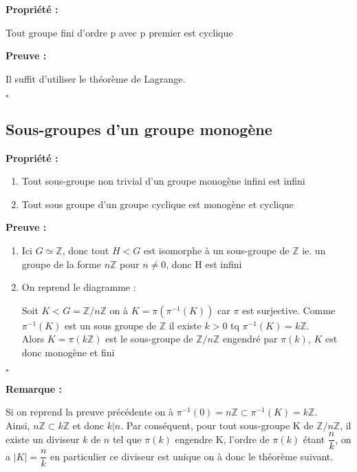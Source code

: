 \documentclass{report}
\renewenvironment{leftbar}{%
  \def\FrameCommand{\vrule width 0.4pt \hspace{10pt}}%
  \MakeFramed {\advance\hsize-\width \FrameRestore}}%
 {\endMakeFramed}%
\newenvironment{preuve}{\vspace*{0.5cm}
    \begin{leftbar}
    \noindent\textbf{Preuve :}\par}{
    \begin{flushright}
    $\square$
    \end{flushright}
    \end{leftbar}
}
\newenvironment{prop}{\begin{tcolorbox}[colframe= white]
    \textbf{Propriété :}
     \par}
    {\end{tcolorbox}}
\newcommand{\remarque}{
    \noindent\textbf{Remarque :} \par
}
\newcommand{\Z}{\mathbb{Z}}
\newcommand{\znz}{\Z/n\Z}
\begin{document}
\begin{prop}
Tout groupe fini d'ordre p avec p premier est cyclique
\end{prop}

\begin{preuve}
Il suffit d'utiliser le théorème de Lagrange.
\end{preuve}


\subsection{Sous-groupes d'un groupe monogène}

\begin{prop}
\begin{enumerate}
\item Tout sous-groupe non trivial d'un groupe monogène infini est infini
\item Tout sous groupe d'un groupe cyclique est monogène et cyclique
\end{enumerate}
\end{prop}

\begin{preuve}
\begin{enumerate}
\item Ici $G\simeq \Z$, donc tout $H<G$ est isomorphe à un sous-groupe de $\Z$ ie. un groupe de la forme $n\Z$ pour $n \neq 0$, donc H est infini
\item On reprend le diagramme :

\begin{center}
\end{center}

Soit $ K < G= \Z/n\Z$ on à $K=\pi(\pi^{-1}(K))$ car $\pi$ est surjective. Comme $\pi^{-1}(K)$ est un sous groupe de $\Z$ il existe $k>0$ tq $\pi^{-1}(K)=k\Z$.\\
Alors $K = \pi(k\Z)$ est le sous-groupe de $\Z/n\Z$ engendré par $\pi(k)$, $K$ est donc monogène et fini

\end{enumerate}
\end{preuve}

\remarque{Si on reprend la preuve précédente on à $\pi^{-1}(0) = n\Z \subset \pi^{-1}(K)= k\Z$.\\ Ainsi, $n\Z \subset k\Z$ et donc $k|n$. Par conséquent, pour tout sous-groupe K de $\znz$, il existe un diviseur $k$ de $n$ tel que $\pi(k)$ engendre K, l'ordre de $\pi(k)$ étant $\dfrac{n}{k}$, on a $|K|=\dfrac{n}{k}$ en particulier ce diviseur est unique on à donc le théorème suivant.}
\end{document}
